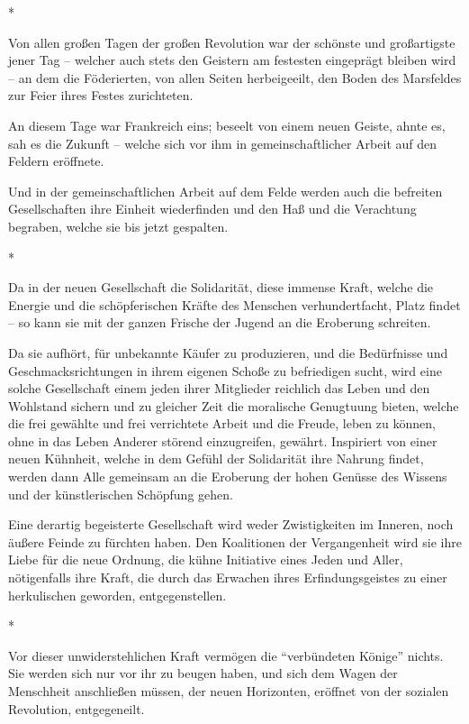 \documentclass{scrbook}
\begin{document}
\begin{center}*\end{center}

Von allen großen Tagen der großen Revolution war der schönste und großartigste jener Tag – welcher auch stets den Geistern am festesten eingeprägt bleiben wird – an dem die Föderierten, von allen Seiten herbeigeeilt, den Boden des Marsfeldes zur Feier ihres Festes zurichteten.

An diesem Tage war Frankreich eins; beseelt von einem neuen Geiste, ahnte es, sah es die Zukunft – welche sich vor ihm in gemeinschaftlicher Arbeit auf den Feldern eröffnete.

Und in der gemeinschaftlichen Arbeit auf dem Felde werden auch die befreiten Gesellschaften ihre Einheit wiederfinden und den Haß und die Verachtung begraben, welche sie bis jetzt gespalten.

\begin{center}*\end{center}

Da in der neuen Gesellschaft die Solidarität, diese immense Kraft, welche die Energie und die schöpferischen Kräfte des Menschen verhundertfacht, Platz findet – so kann sie mit der ganzen Frische der Jugend an die Eroberung schreiten.

Da sie aufhört, für unbekannte Käufer zu produzieren, und die Bedürfnisse und Geschmacksrichtungen in ihrem eigenen Schoße zu befriedigen sucht, wird eine solche Gesellschaft einem jeden ihrer Mitglieder reichlich das Leben und den Wohlstand sichern und zu gleicher Zeit die moralische Genugtuung bieten, welche die frei gewählte und frei verrichtete Arbeit und die Freude, leben zu können, ohne in das Leben Anderer störend einzugreifen, gewährt. Inspiriert von einer neuen Kühnheit, welche in dem Gefühl der Solidarität ihre Nahrung findet, werden dann Alle gemeinsam an die Eroberung der hohen Genüsse des Wissens und der künstlerischen Schöpfung gehen.

Eine derartig begeisterte Gesellschaft wird weder Zwistigkeiten im Inneren, noch äußere Feinde zu fürchten haben. Den Koalitionen der Vergangenheit wird sie ihre Liebe für die neue Ordnung, die kühne Initiative eines Jeden und Aller, nötigenfalls ihre Kraft, die durch das Erwachen ihres Erfindungsgeistes zu einer herkulischen geworden, entgegenstellen.

\begin{center}*\end{center}

Vor dieser unwiderstehlichen Kraft vermögen die ``verbündeten Könige'' nichts. Sie werden sich nur vor ihr zu beugen haben, und sich dem Wagen der Menschheit anschließen müssen, der neuen Horizonten, eröffnet von der sozialen Revolution, entgegeneilt.
\end{document}
